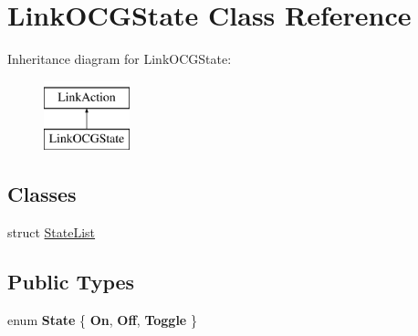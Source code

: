 \hypertarget{class_link_o_c_g_state}{}\section{Link\+O\+C\+G\+State Class Reference}
\label{class_link_o_c_g_state}
Inheritance diagram for Link\+O\+C\+G\+State\+:\begin{figure}[H]
\begin{center}
\leavevmode
\includegraphics[height=2.000000cm]{class_link_o_c_g_state}
\end{center}
\end{figure}
\subsection*{Classes}
\begin{DoxyCompactItemize}
\item 
struct \hyperlink{struct_link_o_c_g_state_1_1_state_list}{State\+List}
\end{DoxyCompactItemize}
\subsection*{Public Types}
\begin{DoxyCompactItemize}
\item 
\mbox{\label{class_link_o_c_g_state_a4d00e3e769793cd23a1f7ea8bc74b71d}} 
enum {\bfseries State} \{ {\bfseries On}, 
{\bfseries Off}, 
{\bfseries Toggle}
 \}
\end{DoxyCompactItemize}
